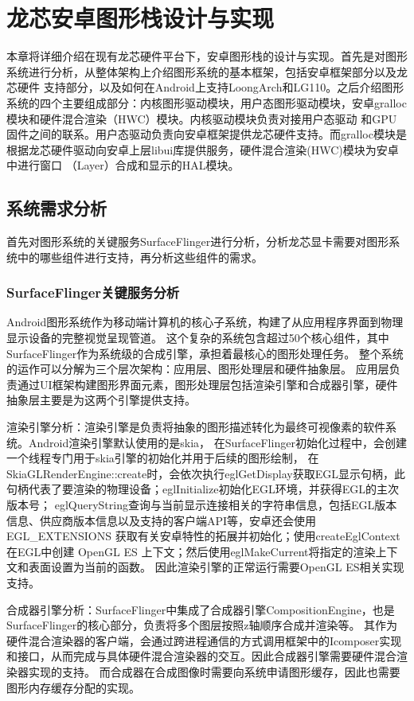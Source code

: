 
\chapter{龙芯安卓图形栈设计与实现}
本章将详细介绍在现有龙芯硬件平台下，安卓图形栈的设计与实现。首先是对图形系统进行分析，从整体架构上介绍图形系统的基本框架，包括安卓框架部分以及龙芯硬件
支持部分，以及如何在Android上支持LoongArch和LG110。之后介绍图形系统的四个主要组成部分：内核图形驱动模块，用户态图形驱动模块，安卓gralloc模块和硬件混合渲染（HWC）模块。内核驱动模块负责对接用户态驱动
和GPU固件之间的联系。用户态驱动负责向安卓框架提供龙芯硬件支持。而gralloc模块是根据龙芯硬件驱动向安卓上层libui库提供服务，硬件混合渲染(HWC)模块为安卓中进行窗口
（Layer）合成和显示的HAL模块。

\section{系统需求分析}

首先对图形系统的关键服务SurfaceFlinger进行分析，分析龙芯显卡需要对图形系统中的哪些组件进行支持，再分析这些组件的需求。

\subsection{SurfaceFlinger关键服务分析}
Android图形系统作为移动端计算机的核心子系统，构建了从应用程序界面到物理显示设备的完整视觉呈现管道。
这个复杂的系统包含超过50个核心组件，其中SurfaceFlinger作为系统级的合成引擎，承担着最核心的图形处理任务。
整个系统的运作可以分解为三个层次架构：应用层、图形处理层和硬件抽象层。
应用层负责通过UI框架构建图形界面元素，图形处理层包括渲染引擎和合成器引擎，硬件抽象层主要是为这两个引擎提供支持。

渲染引擎分析：渲染引擎​是负责将抽象的图形描述转化为最终可视像素的软件系统。Android渲染引擎默认使用的是skia，
在SurfaceFlinger初始化过程中，会创建一个线程专门用于skia引擎的初始化并用于后续的图形绘制，
在SkiaGLRenderEngine::create时，会依次执行eglGetDisplay获取EGL显示句柄，此句柄代表了要渲染的物理设备；eglInitialize初始化EGL环境，并获得EGL的主次版本号；
eglQueryString查询与当前显示连接相关的字符串信息，包括EGL版本信息、供应商版本信息以及支持的客户端API等，安卓还会使用EGL\_EXTENSIONS
获取有关安卓特性的拓展并初始化；使用createEglContext在EGL中创建 OpenGL ES 上下文；然后使用eglMakeCurrent将指定的渲染上下文和表面设置为当前的函数。
因此渲染引擎的正常运行需要OpenGL ES相关实现支持。

合成器引擎分析：SurfaceFlinger中集成了合成器引擎CompositionEngine，也是SurfaceFlinger的核心部分，负责将多个图层按照z轴顺序合成并渲染等。
其作为硬件混合渲染器的客户端，会通过跨进程通信的方式调用框架中的Icomposer实现和接口，从而完成与具体硬件混合渲染器的交互。因此合成器引擎需要硬件混合渲染器实现的支持。
而合成器在合成图像时需要向系统申请图形缓存，因此也需要图形内存缓存分配的实现。

